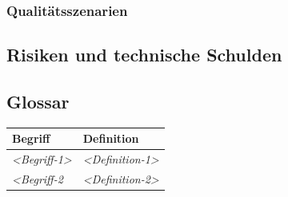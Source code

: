 \subsubsection{Qualitätsszenarien}\label{_qualit_tsszenarien}

\subsection{Risiken und technische Schulden}\label{section-technical-risks}

\subsection{Glossar}\label{section-glossary}

\begin{longtable}[]{@{}ll@{}}
\toprule
\begin{minipage}[b]{0.31\columnwidth}\raggedright\strut
Begriff\strut
\end{minipage} & \begin{minipage}[b]{0.63\columnwidth}\raggedright\strut
Definition\strut
\end{minipage}\tabularnewline
\midrule
\endhead
\begin{minipage}[t]{0.31\columnwidth}\raggedright\strut
\emph{\textless{}Begriff-1\textgreater{}}\strut
\end{minipage} & \begin{minipage}[t]{0.63\columnwidth}\raggedright\strut
\emph{\textless{}Definition-1\textgreater{}}\strut
\end{minipage}\tabularnewline
\begin{minipage}[t]{0.31\columnwidth}\raggedright\strut
\emph{\textless{}Begriff-2}\strut
\end{minipage} & \begin{minipage}[t]{0.63\columnwidth}\raggedright\strut
\emph{\textless{}Definition-2\textgreater{}}\strut
\end{minipage}\tabularnewline
\bottomrule
\end{longtable}

